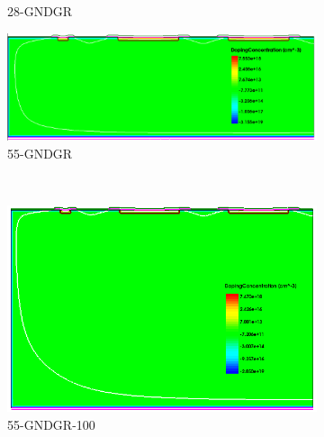\begin{figure}[htbp]
\begin{subfigure}[b]{0.5\linewidth}
    \caption{28-GNDGR}
  \end{subfigure}\hfill
  \begin{subfigure}[b]{0.5\linewidth}
    \includegraphics[width=\textwidth]{figures/TCAD/dopingConcentration_55_GNDGR.png}
    \caption{55-GNDGR}
  \end{subfigure} \\
  \begin{subfigure}[b]{0.5\linewidth}
    \includegraphics[width=\textwidth]{figures/TCAD/dopingConcentration_55_GNDGR_100.png}
    \caption{55-GNDGR-100}
  \end{subfigure}\hfill
  \begin{subfigure}[b]{0.5\linewidth}

\end{subfigure}
\end{figure}
